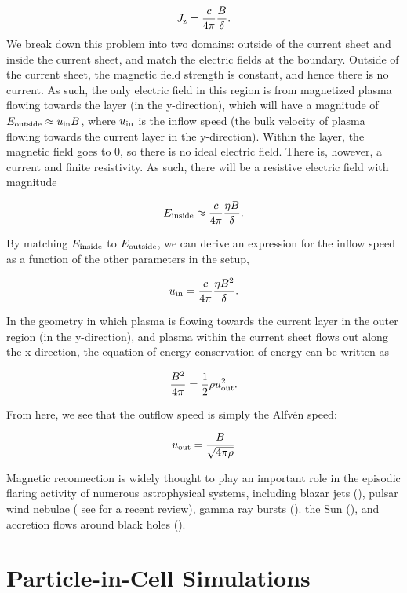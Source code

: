 \begin{equation}
	J_{\rm{z}} = \frac{c}{4 \pi}\frac{B}{\delta}.
\end{equation}    
We break down this problem into two domains: outside of the current sheet and inside the current sheet, and match the electric fields at the boundary. Outside of the current sheet, the magnetic field strength is constant, and hence there is no current.  As such, the only electric field in this region is from magnetized plasma flowing towards the layer (in the y-direction), which will have a magnitude of $E_{\rm{outside}} \approx u_{\rm{in}}B$, where $u_{\rm{in}}$ is the inflow speed (the bulk velocity of plasma flowing towards the current layer in the y-direction).  Within the layer, the magnetic field goes to 0, so there is no ideal electric field.  There is, however, a current and finite resistivity.  As such, there will be a resistive electric field with magnitude 

\begin{equation}
E_{\rm{inside}} \approx \frac{c}{4\pi}\frac{\eta B}{\delta}.
\end{equation}

By matching $E_{\rm{inside}}$ to $E_{\rm{outside}}$, we can derive an expression for the inflow speed as a function of the other parameters in the setup,

\begin{equation}
	u_{\rm{in}} = \frac{c}{4 \pi} \frac{\eta B^2}{\delta}.
\end{equation}

In the geometry in which plasma is flowing towards the current layer in the outer region (in the y-direction), and plasma within the current sheet flows out along the x-direction, the equation of energy conservation of energy can be written as

\begin{equation}
	\frac{B^2}{4 \pi} = \frac{1}{2}\rho u_{\rm{out}}^2.
\end{equation}

From here, we see that the outflow speed is simply the Alfv\'en speed: 

\begin{equation}
	u_{\rm{out}}=\frac{B}{\sqrt{4\pi \rho}}
\end{equation}

Magnetic reconnection is widely thought to play an important role in the episodic flaring activity of numerous astrophysical systems, including blazar jets (\citealt{giannios2013, petropoulou2016, nalewajko2016}), pulsar wind nebulae (\citealt{coroniti1990, lyubarsky2001, zenitani2001, kirk2003, contopoulos2007, petri2008, sironi2011, cerutti2012,cerutti2014,cerutti2017, philippov2014} see \citealt{sironi2017} for a recent review), gamma ray bursts (\citealt{thompson1994, thompson2006, usov1994, spruit2001, drenkhahn2002, lyutikov2003, giannios2008}). the Sun (\citealt{forbes1996, yokoyama2001, shibata2011}), and accretion flows around black holes (\citealt{galeev1979, dimatteo1998, uzdensky2008, li2015, ball2016, li2017}).


\section{Particle-in-Cell Simulations}


